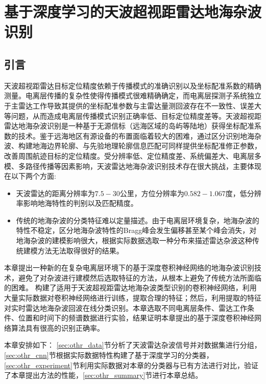 
\chapter{基于深度学习的天波超视距雷达地海杂波识别}
\label{sec:othr}
\section{引言}

天波超视距雷达目标定位精度依赖于传播模式的准确识别以及坐标配准系数的精确测量。电离层传播的复杂性使得传播模式很难精确确定，而电离层探测子系统独立于主雷达工作导致其提供的坐标配准参数与主雷达量测回波存在不一致性、误差大等问题，从而造成电离层传播模式识别正确率低、目标定位精度差等。天波超视距雷达地海杂波识别是一种基于无源信标（远海区域的岛屿等陆地）获得坐标配准系数的技术。鉴于远海地区有源设备的布置面临着较大的困难，通过区分识别地海杂波、构建地海边界轮廓、与先验地理轮廓信息匹配可同样提供坐标配准修正参数，改善周围航迹目标的定位精度。受分辨率低、定位精度差、系统偏差大、电离层多模、多路径传播等因素影响，天波雷达地海杂波识别技术存在很大挑战，主要体现在以下两个方面:
\begin{itemize}
	\item 天波雷达的距离分辨率为$7.5-30$公里，方位分辨率为$0.582-1.067$度，低分辨率影响地海特性的判别以及匹配精度。
	\item 传统的地海杂波的分类特征难以定量描述。由于电离层环境复杂，地海杂波的特性不稳定，区分地海杂波特性的Bragg峰会发生偏移甚至某个峰会消失，对地海杂波的建模影响很大，根据实际数据选取一种分布来描述雷达杂波这种传统建模方法无法取得很好的结果。
\end{itemize}

本章提出一种新的在复杂电离层环境下的基于深度卷积神经网络的地海杂波识别技术，避免了对杂波进行建模然后选取特征的方法，从根本上避免了传统方法所面临的困难。
构建了适用于天波超视距雷达地海杂波类型识别的卷积神经网络，利用大量实际数据对卷积神经网络进行训练，提取合理的特征；然后，利用提取的特征对实时雷达地海杂波回波在线分类识别。本章选取不同电离层条件、雷达工作条件、位置和时间下的频谱数据进行实验，结果证明本章提出的基于深度卷积神经网络算法具有很高的识别正确率。

本章安排如下： \ref{sec:othr_data}节分析了天波雷达杂波信号并对数据集进行分组，\ref{sec:othr_cnn}节根据实际数据特性构建了基于深度学习的分类器，\ref{sec:othr_experiment}节利用实际数据对本章的分类器与已有方法进行对比，验证了本章提出方法的性能，\ref{sec:othr_summary}节进行本章总结。

